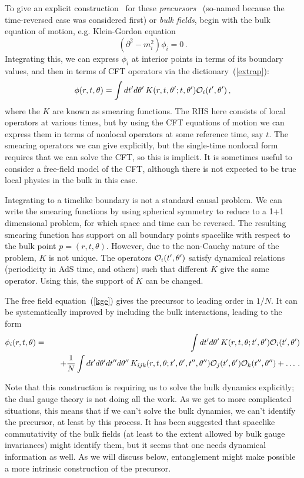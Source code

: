 \documentclass[12pt]{article}
\newcommand{\be}{\begin{equation}}
\newcommand{\ee}{\end{equation}}
\newcommand{\bea}{\begin{eqnarray}}
\newcommand{\eea}{\end{eqnarray}}
\begin{document}
To give an explicit construction~\cite{Hamilton:2006az}  for these {\it precursors} \cite{Polchinski:1999yd}\ (so-named because the time-reversed case was considered first) or {\it bulk fields}, begin with the bulk equation of motion, e.g. Klein-Gordon equation
\be
(\partial^2 - m_i^2) \phi_i = 0 \,.  \label{kge}
\ee
Integrating this, we can express $\phi_i$ at interior points in terms of its boundary values, and then in terms of CFT operators via the dictionary~(\ref{extrap}):
\be
\phi(r, t, \theta) = \int dt'd\theta'\, K(r, t, \theta';  t, \theta') {\cal O}_i(t',\theta') \,, \label{precur}
\ee
where the $K$ are known as smearing functions.  The RHS here consists of local operators at various times, but by using the CFT equations of motion we can express them in terms of nonlocal operators at some reference time, say $t$.  The smearing operators we can give explicitly, but the single-time nonlocal form requires that we can solve the CFT, so this is implicit.  It is sometimes useful to consider a free-field model of the CFT, although there is not expected to be true local physics in the bulk in this case.

Integrating to a timelike boundary is not a standard causal problem.  We can write the smearing functions by using spherical symmetry to reduce to a 1+1 dimensional problem, for which space and time can be reversed.  The resulting smearing function has support on all boundary points spacelike with respect to the bulk point $p = (r, t, \theta)$.  However, due to the non-Cauchy nature of the problem, $K$ is not unique.  The operators ${\cal O}_i(t',\theta')$ satisfy dynamical relations (periodicity in AdS time, and others) such that different $K$ give the same operator.  Using this, the support of $K$ can be changed. 

The free field equation~(\ref{kge}) gives the precursor to leading order in $1/N$.  It can be systematically improved by including the bulk interactions, leading to the form
\bea
\phi_i(r, t, \theta) &=& \int dt'd\theta'\, K(r, t, \theta;  t', \theta') {\cal O}_i(t',\theta') \nonumber\\
&&\quad + \frac{1}{N} \int dt'd\theta' dt''d\theta''\, K_{ijk}(r, t, \theta;  t', \theta', t'', \theta'') {\cal O}_j(t',\theta'){\cal O}_k(t'',\theta'') + \ldots \,.
\label{preser}
\eea

Note that this construction is requiring us to solve the bulk dynamics explicitly; the dual gauge theory is not doing all the work.  As we get to more complicated situations, this means that if we can't solve the bulk dynamics, we can't identify the precursor, at least by this process.  It has been suggested that spacelike commutativity of the bulk fields (at least to the extent allowed by bulk gauge invariances) might identify them, but it seems that one needs dynamical information as well.   As we will discuss below, entanglement might make possible a more intrinsic construction of the precursor.
\end{document}
